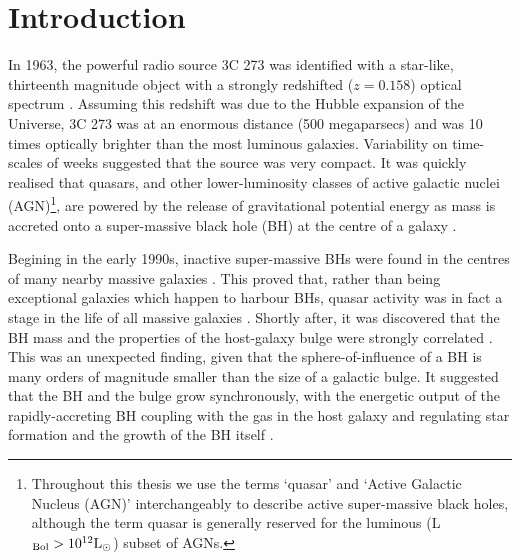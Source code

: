 
\chapter{Introduction}
\label{ch:intro}

In 1963, the powerful radio source 3C 273 was identified with a star-like, thirteenth magnitude object with a strongly redshifted ($z=0.158$)  optical spectrum \citep{schmidt63}. 
Assuming this redshift was due to the Hubble expansion of the Universe, 3C 273 was at an enormous distance (500 megaparsecs) and was 10 times optically brighter than the most luminous galaxies. 
Variability on time-scales of weeks suggested that the source was very compact.
It was quickly realised that quasars, and other lower-luminosity classes of active galactic nuclei (AGN)\footnote{Throughout this thesis we use the terms `quasar' and `Active Galactic Nucleus (AGN)' interchangeably to describe active super-massive black holes, although the term quasar is generally reserved for the luminous (L$_{\rm Bol} > 10^{12}{\rm L}_{\odot}$) subset of AGNs.}, are powered by the release of gravitational potential energy as mass is accreted onto a super-massive  black hole (BH) at the centre of a galaxy \citep[e.g.][]{hoyle63,salpeter64,lynden-bell69,lynden-bell71}. 

Begining in the early 1990s, inactive super-massive BHs were found in the centres of many nearby massive galaxies \citep[e.g.][]{kormendy95,ferrarese05,kormendy13}.
This proved that, rather than being exceptional galaxies which happen to harbour BHs, quasar activity was in fact a stage in the life of all massive galaxies \citep[e.g.][]{lynden-bell69}. 
Shortly after, it was discovered that the BH mass and the properties of the host-galaxy bulge were strongly correlated \citep[e.g. the M$_{\rm BH}$-$\sigma$ relation][]{ferrarese00,gebhardt00,graham01,tremaine02,marconi03,aller07,gultekin09}. 
This was an unexpected finding, given that the sphere-of-influence  of a BH is many orders of magnitude smaller than the size of a galactic bulge. 
It suggested that the BH and the bulge grow synchronously, with the energetic output of the rapidly-accreting BH coupling with the gas in the host galaxy and regulating star formation and the growth of the BH itself \citep[e.g.][]{silk98,king03,dimatteo05,king15}. 

